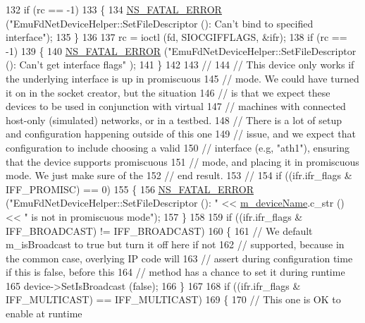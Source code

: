 \begin{DoxyCode}
132   \textcolor{keywordflow}{if} (rc == -1)
133     \{
134       \hyperlink{group__fatal_ga5131d5e3f75d7d4cbfd706ac456fdc85}{NS\_FATAL\_ERROR} (\textcolor{stringliteral}{"EmuFdNetDeviceHelper::SetFileDescriptor (): Can't bind to specified
       interface"});
135     \}
136 
137   rc = ioctl (fd, SIOCGIFFLAGS, &ifr);
138   \textcolor{keywordflow}{if} (rc == -1)
139     \{
140       \hyperlink{group__fatal_ga5131d5e3f75d7d4cbfd706ac456fdc85}{NS\_FATAL\_ERROR} (\textcolor{stringliteral}{"EmuFdNetDeviceHelper::SetFileDescriptor (): Can't get interface flags"}
      );
141     \}
142 
143   \textcolor{comment}{//}
144   \textcolor{comment}{// This device only works if the underlying interface is up in promiscuous}
145   \textcolor{comment}{// mode.  We could have turned it on in the socket creator, but the situation}
146   \textcolor{comment}{// is that we expect these devices to be used in conjunction with virtual}
147   \textcolor{comment}{// machines with connected host-only (simulated) networks, or in a testbed.}
148   \textcolor{comment}{// There is a lot of setup and configuration happening outside of this one}
149   \textcolor{comment}{// issue, and we expect that configuration to include choosing a valid}
150   \textcolor{comment}{// interface (e.g, "ath1"), ensuring that the device supports promiscuous}
151   \textcolor{comment}{// mode, and placing it in promiscuous mode.  We just make sure of the}
152   \textcolor{comment}{// end result.}
153   \textcolor{comment}{//}
154   \textcolor{keywordflow}{if} ((ifr.ifr\_flags & IFF\_PROMISC) == 0)
155     \{
156       \hyperlink{group__fatal_ga5131d5e3f75d7d4cbfd706ac456fdc85}{NS\_FATAL\_ERROR} (\textcolor{stringliteral}{"EmuFdNetDeviceHelper::SetFileDescriptor (): "} << 
      \hyperlink{classns3_1_1EmuFdNetDeviceHelper_a5c259590827f139ae1189a99addeca6a}{m\_deviceName}.c\_str () << \textcolor{stringliteral}{" is not in promiscuous mode"});
157     \}
158 
159   \textcolor{keywordflow}{if} ((ifr.ifr\_flags & IFF\_BROADCAST) != IFF\_BROADCAST)
160     \{
161       \textcolor{comment}{// We default m\_isBroadcast to true but turn it off here if not}
162       \textcolor{comment}{// supported, because in the common case, overlying IP code will}
163       \textcolor{comment}{// assert during configuration time if this is false, before this}
164       \textcolor{comment}{// method has a chance to set it during runtime}
165       device->SetIsBroadcast (\textcolor{keyword}{false});
166     \}
167 
168   \textcolor{keywordflow}{if} ((ifr.ifr\_flags & IFF\_MULTICAST) == IFF\_MULTICAST)
169     \{
170       \textcolor{comment}{// This one is OK to enable at runtime}

\end{DoxyCode}
